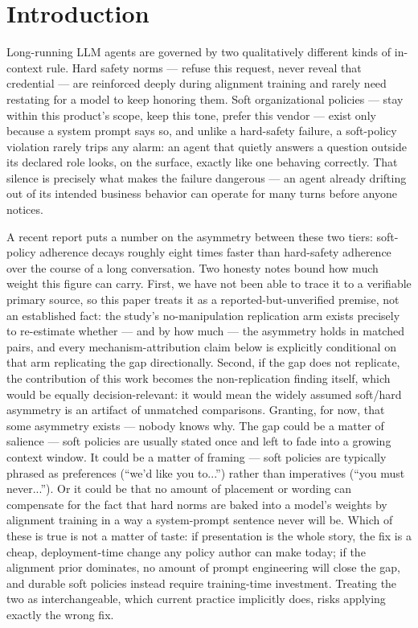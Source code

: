 \documentclass[11pt]{article}
\begin{document}
\section{Introduction}

Long-running LLM agents are governed by two qualitatively different kinds of in-context rule. Hard safety norms --- refuse this request, never reveal that credential --- are reinforced deeply during alignment training and rarely need restating for a model to keep honoring them. Soft organizational policies --- stay within this product's scope, keep this tone, prefer this vendor --- exist only because a system prompt says so, and unlike a hard-safety failure, a soft-policy violation rarely trips any alarm: an agent that quietly answers a question outside its declared role looks, on the surface, exactly like one behaving correctly. That silence is precisely what makes the failure dangerous --- an agent already drifting out of its intended business behavior can operate for many turns before anyone notices.

A recent report puts a number on the asymmetry between these two tiers: soft-policy adherence decays roughly eight times faster than hard-safety adherence over the course of a long conversation. Two honesty notes bound how much weight this figure can carry. First, we have not been able to trace it to a verifiable primary source, so this paper treats it as a reported-but-unverified premise, not an established fact: the study's no-manipulation replication arm exists precisely to re-estimate whether --- and by how much --- the asymmetry holds in matched pairs, and every mechanism-attribution claim below is explicitly conditional on that arm replicating the gap directionally. Second, if the gap does not replicate, the contribution of this work becomes the non-replication finding itself, which would be equally decision-relevant: it would mean the widely assumed soft/hard asymmetry is an artifact of unmatched comparisons. Granting, for now, that some asymmetry exists --- nobody knows why. The gap could be a matter of salience --- soft policies are usually stated once and left to fade into a growing context window. It could be a matter of framing --- soft policies are typically phrased as preferences (``we'd like you to...'') rather than imperatives (``you must never...''). Or it could be that no amount of placement or wording can compensate for the fact that hard norms are baked into a model's weights by alignment training in a way a system-prompt sentence never will be. Which of these is true is not a matter of taste: if presentation is the whole story, the fix is a cheap, deployment-time change any policy author can make today; if the alignment prior dominates, no amount of prompt engineering will close the gap, and durable soft policies instead require training-time investment. Treating the two as interchangeable, which current practice implicitly does, risks applying exactly the wrong fix.
\end{document}
